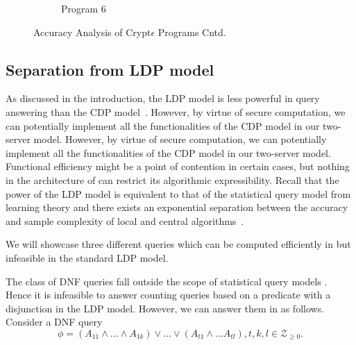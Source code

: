 \begin{figure}
\begin{subfigure}[b]{0.25\linewidth}
        \caption{Program 6}
        \label{fig:P6}\end{subfigure}
   \caption{Accuracy Analysis of Crypt$\epsilon$ Programs Cntd.}
   \label{accuracy-appendix}
\end{figure}



\subsection{Separation from LDP model}\label{app:sepldp}
As discussed in the introduction, the \textsf{LDP} model is less powerful in query answering than the \textsf{CDP} model~\cite{Kasivi,mixnets}. However, by virtue of secure computation, we can potentially implement all the functionalities of the \textsf{CDP} model in our two-server model. However, by virtue of secure computation, we can potentially implement all the functionalities of the \textsf{CDP} model in our two-server model. Functional efficiency might be a point of contention in certain cases, but nothing in the architecture of  \system can restrict its algorithmic expressibility. Recall that the power of the \textsf{LDP} model is equivalent to that of the statistical query model \cite{SQ1} from learning theory and there exists an exponential separation between the accuracy and sample complexity of local and central algorithms~\cite{Kasivi}.

We will showcase three different queries which can be computed efficiently in \system but infeasible in the standard \textsf{LDP} model.

The class of DNF queries fall outside the scope of statistical query models \cite{DNF}. Hence it is infeasible to answer counting queries based on a predicate with a disjunction in the \textsf{LDP} model. However, we can answer them in \system as follows.
Consider a DNF query 
$$\phi = (A_{11}\land ...\land A_{1k}) \vee ... \vee (A_{t1}\land ... A_{tl}), t, k,l \in \mathcal{Z}_{\geq 0}.$$

